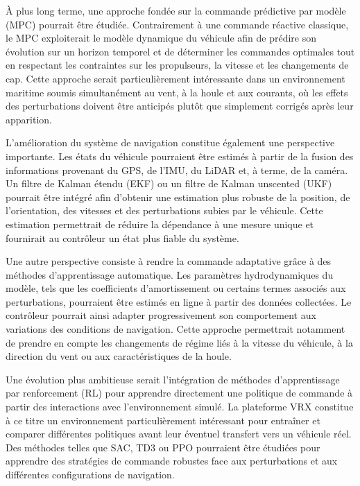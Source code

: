 \documentclass{rapportEILCO}
\begin{document}
	À plus long terme, une approche fondée sur la commande prédictive par modèle (MPC) pourrait être étudiée. Contrairement à une commande réactive classique, le MPC exploiterait le modèle dynamique du véhicule afin de prédire son évolution sur un horizon temporel et de déterminer les commandes optimales tout en respectant les contraintes sur les propulseurs, la vitesse et les changements de cap. Cette approche serait particulièrement intéressante dans un environnement maritime soumis simultanément au vent, à la houle et aux courants, où les effets des perturbations doivent être anticipés plutôt que simplement corrigés après leur apparition.
	

	L'amélioration du système de navigation constitue également une perspective importante. Les états du véhicule pourraient être estimés à partir de la fusion des informations provenant du GPS, de l'IMU, du LiDAR et, à terme, de la caméra. Un filtre de Kalman étendu (EKF) ou un filtre de Kalman unscented (UKF) pourrait être intégré afin d'obtenir une estimation plus robuste de la position, de l'orientation, des vitesses et des perturbations subies par le véhicule. Cette estimation permettrait de réduire la dépendance à une mesure unique et fournirait au contrôleur un état plus fiable du système.
	

	Une autre perspective consiste à rendre la commande adaptative grâce à des méthodes d'apprentissage automatique. Les paramètres hydrodynamiques du modèle, tels que les coefficients d'amortissement ou certains termes associés aux perturbations, pourraient être estimés en ligne à partir des données collectées. Le contrôleur pourrait ainsi adapter progressivement son comportement aux variations des conditions de navigation. Cette approche permettrait notamment de prendre en compte les changements de régime liés à la vitesse du véhicule, à la direction du vent ou aux caractéristiques de la houle.
	

	Une évolution plus ambitieuse serait l'intégration de méthodes d'apprentissage par renforcement (RL) pour apprendre directement une politique de commande à partir des interactions avec l'environnement simulé. La plateforme VRX constitue à ce titre un environnement particulièrement intéressant pour entraîner et comparer différentes politiques avant leur éventuel transfert vers un véhicule réel. Des méthodes telles que SAC, TD3 ou PPO pourraient être étudiées pour apprendre des stratégies de commande robustes face aux perturbations et aux différentes configurations de navigation.
	
\end{document}
